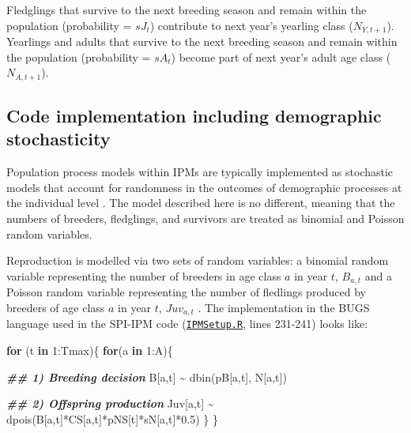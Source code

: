 \documentclass[
]{book}
\newenvironment{Shaded}{\begin{snugshade}}{\end{snugshade}}
\newcommand{\ControlFlowTok}[1]{\textcolor[rgb]{0.13,0.29,0.53}{\textbf{#1}}}
\newcommand{\DecValTok}[1]{\textcolor[rgb]{0.00,0.00,0.81}{#1}}
\newcommand{\DocumentationTok}[1]{\textcolor[rgb]{0.56,0.35,0.01}{\textbf{\textit{#1}}}}
\newcommand{\FloatTok}[1]{\textcolor[rgb]{0.00,0.00,0.81}{#1}}
\newcommand{\FunctionTok}[1]{\textcolor[rgb]{0.00,0.00,0.00}{#1}}
\newcommand{\NormalTok}[1]{#1}
\newcommand{\SpecialCharTok}[1]{\textcolor[rgb]{0.00,0.00,0.00}{#1}}
\begin{document}
Fledglings that survive to the next breeding season and remain within the
population (probability = \(sJ_t\)) contribute to next year's yearling class
(\(N_{Y,t+1}\)). Yearlings and adults that survive to the next breeding season and
remain within the population (probability = \(sA_t\)) become part of next year's
adult age class (\(N_{A,t+1}\)).

\hypertarget{code-implementation-including-demographic-stochasticity}{%
\subsection{Code implementation including demographic stochasticity}\label{code-implementation-including-demographic-stochasticity}}

Population process models within IPMs are typically implemented as stochastic
models that account for randomness in the outcomes of demographic processes at
the individual level \citep[``demographic stochasticity'',][]{Caswell2001, kery2011}.
The model described here is no different, meaning that the numbers of breeders,
fledglings, and survivors are treated as binomial and Poisson random variables.

Reproduction is modelled via two sets of random variables: a binomial random
variable representing the number of breeders in age class \(a\) in year \(t\),
\(B_{a,t}\) and a Poisson random variable representing the
number of fledlings produced by breeders of age class \(a\) in year \(t\),
\(Juv_{a,t}\) . The implementation in the BUGS language used in the
SPI-IPM code (\href{https://github.com/SPI-Birds/SPI-IPM/blob/main/SPI-IPM_Code/02-04_IPM_Setup\&Run/IPMSetup.R}{\texttt{IPMSetup.R}}, lines 231-241) looks like:

\begin{Shaded}
\begin{Highlighting}[]
\ControlFlowTok{for}\NormalTok{ (t }\ControlFlowTok{in} \DecValTok{1}\SpecialCharTok{:}\NormalTok{Tmax)\{}
  \ControlFlowTok{for}\NormalTok{(a }\ControlFlowTok{in} \DecValTok{1}\SpecialCharTok{:}\NormalTok{A)\{}
    
    \DocumentationTok{\#\# 1) Breeding decision}
\NormalTok{    B[a,t] }\SpecialCharTok{\textasciitilde{}} \FunctionTok{dbin}\NormalTok{(pB[a,t], N[a,t])}
    
    \DocumentationTok{\#\# 2) Offspring production}
\NormalTok{    Juv[a,t] }\SpecialCharTok{\textasciitilde{}} \FunctionTok{dpois}\NormalTok{(B[a,t]}\SpecialCharTok{*}\NormalTok{CS[a,t]}\SpecialCharTok{*}\NormalTok{pNS[t]}\SpecialCharTok{*}\NormalTok{sN[a,t]}\SpecialCharTok{*}\FloatTok{0.5}\NormalTok{)}
\NormalTok{  \}}
\NormalTok{\}}
\end{Highlighting}
\end{Shaded}
\end{document}
